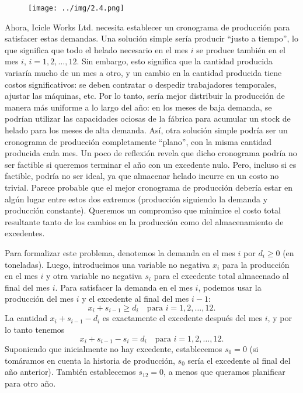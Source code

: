 \documentclass{article}
\begin{document}
\begin{figure}[H] %
\centering %
\texttt{[image: ../img/2.4.png]} %
\label{fig:imagen} %
\end{figure}

Ahora, Icicle Works Ltd. necesita establecer un cronograma de producción para satisfacer estas demandas.
Una solución simple sería producir “justo a tiempo”, lo que significa que todo el helado necesario en el mes \(i\) se produce también en el mes \(i\), \(i = 1, 2, \dots, 12\).
Sin embargo, esto significa que la cantidad producida variaría mucho de un mes a otro, y un cambio en la cantidad producida tiene costos significativos: se deben contratar o despedir trabajadores temporales, ajustar las máquinas, etc.
Por lo tanto, sería mejor distribuir la producción de manera más uniforme a lo largo del año: en los meses de baja demanda, se podrían utilizar las capacidades ociosas de la fábrica para acumular un stock de helado para los meses de alta demanda.
Así, otra solución simple podría ser un cronograma de producción completamente “plano”, con la misma cantidad producida cada mes. Un poco de reflexión revela que dicho cronograma podría no ser factible si queremos terminar el año con un excedente nulo. Pero, incluso si es factible, podría no ser ideal, ya que almacenar helado incurre en un costo no trivial. Parece probable que el mejor cronograma de producción debería estar en algún lugar entre estos dos extremos (producción siguiendo la demanda y producción constante). Queremos un compromiso que minimice el costo total resultante tanto de los cambios en la producción como del almacenamiento de excedentes.

Para formalizar este problema, denotemos la demanda en el mes \(i\) por \(d_i \geq 0\) (en toneladas). Luego, introducimos una variable no negativa \(x_i\) para la producción en el mes \(i\) y otra variable no negativa \(s_i\) para el excedente total almacenado al final del mes \(i\). Para satisfacer la demanda en el mes \(i\), podemos usar la producción del mes \(i\) y el excedente al final del mes \(i-1\):
\[
x_i + s_{i-1} \geq d_i \quad \text{para } i = 1, 2, \dots, 12.
\]
La cantidad \(x_i + s_{i-1} - d_i\) es exactamente el excedente después del mes \(i\), y por lo tanto tenemos
\[
x_i + s_{i-1} - s_i = d_i \quad \text{para } i = 1, 2, \dots, 12.
\]
Suponiendo que inicialmente no hay excedente, establecemos \(s_0 = 0\) (si tomáramos en cuenta la historia de producción, \(s_0\) sería el excedente al final del año anterior). También establecemos \(s_{12} = 0\), a menos que queramos planificar para otro año.
\end{document}

